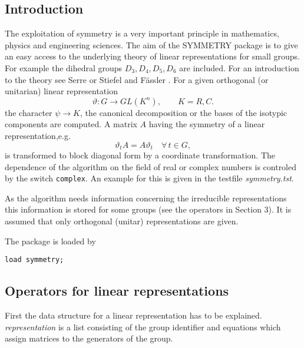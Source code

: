 

\iffalse
This short note describes a package of \REDUCE{} procedures
that compute symmetry-adapted bases and block diagonal forms
of matrices which have the symmetry of a group.
The SYMMETRY package is the implementation
of the theory of linear representations
for small finite groups such as the dihedral groups.
\fi

\subsection{Introduction}

The exploitation of symmetry is a very important principle in mathematics,
physics and engineering sciences.
The aim of the SYMMETRY package is to give an easy access to the
underlying theory of linear representations for small groups. For
example the
dihedral groups $D_3,D_4,D_5,D_6$ are included.
For an introduction to the theory see {\sc Serre} \cite{Se77} or
{\sc Stiefel} and {\sc F\"assler} \cite{StFae79}.
For a given orthogonal (or unitarian) linear representation
\[
\vartheta : G\longrightarrow GL(K^n), \qquad K=R,C.
\]
the character $\psi\rightarrow K$, the
canonical decomposition or the bases of the isotypic
components are computed. A matrix $A$ having the symmetry of a linear
representation,e.g.
\[
\vartheta_t A = A \vartheta_t \quad \forall \, t\in G,
\]
is transformed to block diagonal form by a coordinate
transformation.
The dependence of the algorithm on the
field of real or complex numbers is controled by the switch {\tt complex}.
An example for this is given in the testfile {\em symmetry.tst}.

As the algorithm needs information concerning the irreducible representations
this information is stored for some groups (see the operators in Section 3).
It is assumed that only orthogonal (unitar) representations are given.

The package is loaded by

{\tt load symmetry;}

\subsection{Operators for linear representations}

First the data structure for a linear representation has to be explained.
{\em representation} is a list consisting of the group identifier and
equations which assign matrices to the generators of the group.

